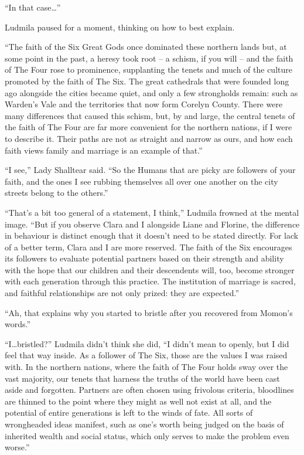 “In that case…”

 

Ludmila paused for a moment, thinking on how to best explain.

 

“The faith of the Six Great Gods once dominated these northern lands but, at some point in the past, a heresy took root – a schism, if you will – and the faith of The Four rose to prominence, supplanting the tenets and much of the culture promoted by the faith of The Six. The great cathedrals that were founded long ago alongside the cities became quiet, and only a few strongholds remain: such as Warden’s Vale and the territories that now form Corelyn County. There were many differences that caused this schism, but, by and large, the central tenets of the faith of The Four are far more convenient for the northern nations, if I were to describe it. Their paths are not as straight and narrow as ours, and how each faith views family and marriage is an example of that.”

 

“I see,” Lady Shalltear said. “So the Humans that are picky are followers of your faith, and the ones I see rubbing themselves all over one another on the city streets belong to the others.”

 

“That’s a bit too general of a statement, I think,” Ludmila frowned at the mental image. “But if you observe Clara and I alongside Liane and Florine, the difference in behaviour is distinct enough that it doesn’t need to be stated directly. For lack of a better term, Clara and I are more reserved. The faith of the Six encourages its followers to evaluate potential partners based on their strength and ability with the hope that our children and their descendents will, too, become stronger with each generation through this practice. The institution of marriage is sacred, and faithful relationships are not only prized: they are expected.”

 

“Ah, that explains why you started to bristle after you recovered from Momon’s words.”

 

“I…bristled?” Ludmila didn’t think she did, “I didn’t mean to openly, but I did feel that way inside. As a follower of The Six, those are the values I was raised with. In the northern nations, where the faith of The Four holds sway over the vast majority, our tenets that harness the truths of the world have been cast aside and forgotten. Partners are often chosen using frivolous criteria, bloodlines are thinned to the point where they might as well not exist at all, and the potential of entire generations is left to the winds of fate. All sorts of wrongheaded ideas manifest, such as one’s worth being judged on the basis of inherited wealth and social status, which only serves to make the problem even worse.”


